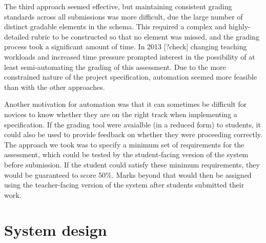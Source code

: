 \documentclass[sigconf, authordraft, capitalise]{acmart}
\begin{document}
The third approach seemed effective, but maintaining consistent grading standards across all submissions was more difficult, due the large number of distinct gradable elements in the schema. This required a complex and highly-detailed rubric to be constructed so that no element was missed, and the grading process took a significant amount of time. In 2013 [?check] changing teaching workloads and increased time pressure prompted interest in the possibility of at least semi-automating the grading of this assessment. Due to the more constrained nature of the project specification, automation seemed more feasible than with the other approaches.

Another motivation for automation was that it can sometimes be difficult for novices to know whether they are on the right track when implementing a specification. If the grading tool were avaialble (in a reduced form) to students, it could also be used to provide feedback on whether they were proceeding correctly. The approach we took was to specify a minimum set of requirements for the assessment, which could be tested by the student-facing version of the system before submission. If the student could satisfy these minimum requirements, they would be guaranteed to score 50\%. Marks beyond that would then be assigned using the teacher-facing version of the system after students submitted their work.


\section{System design}
\label{sec-design}

\end{document}
